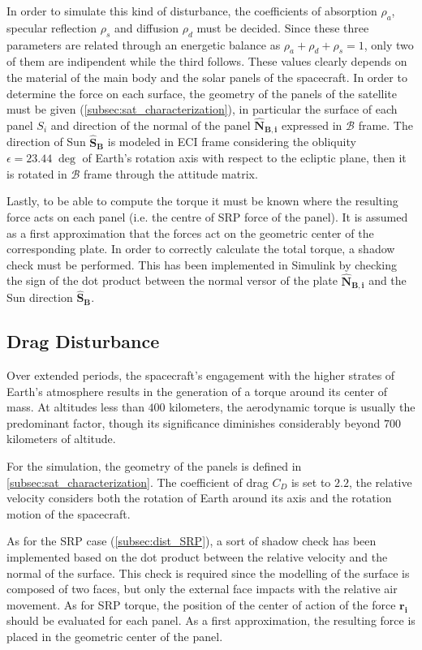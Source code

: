 In order to simulate this kind of disturbance, the coefficients of absorption $\rho_a$, specular reflection $\rho_s$ and diffusion $\rho_d$ must be decided. Since these three parameters are related through an energetic balance as $\rho_a + \rho_d + \rho_s = 1$, only two of them are indipendent while the third follows. These values clearly depends on the material of the main body and the solar panels of the spacecraft.
In order to determine the force on each surface, the geometry of the panels of the satellite must be given (\autoref{subsec:sat_characterization}), in particular the surface of each panel $S_i$ and direction of the normal of the panel $\boldsymbol{\hat{N}_{B,i}}$ expressed in $\mathcal{B}$ frame.
The direction of Sun $\boldsymbol{\hat{S}_B}$ is modeled in ECI frame considering the obliquity $\epsilon = 23.44 \; \deg$ of Earth's rotation axis with respect to the ecliptic plane, then it is rotated in $\mathcal{B}$ frame through the attitude matrix.

Lastly, to be able to compute the torque it must be known where the resulting force acts on each panel (i.e. the centre of SRP force of the panel). It is assumed as a first approximation that the forces act on the geometric center of the corresponding plate. In order to correctly calculate the total torque, a shadow check must be performed. This has been implemented in Simulink by checking the sign of the dot product between the normal versor of the plate $\boldsymbol{\hat{N}_{B,i}}$ and the Sun direction $\boldsymbol{\hat{S}_B}$.


\subsection{Drag Disturbance}
\label{subsec:dist_drag}

Over extended periods, the spacecraft's engagement with the higher strates of Earth's atmosphere results in the generation of a torque around its center of mass. At altitudes less than $400$ kilometers, the aerodynamic torque is usually the predominant factor, though its significance diminishes considerably beyond $700$ kilometers of altitude.

For the simulation, the geometry of the panels is defined in \autoref{subsec:sat_characterization}. The coefficient of drag $C_D$ is set to $2.2$, the relative velocity considers both the rotation of Earth around its axis and the rotation motion of the spacecraft.

As for the SRP case (\autoref{subsec:dist_SRP}), a sort of shadow check has been implemented based on the dot product between the relative velocity and the normal of the surface. This check is required since the modelling of the surface is composed of two faces, but only the external face impacts with the relative air movement.
As for SRP torque, the position of the center of action of the force $\boldsymbol{r_i}$ should be evaluated for each panel. As a first approximation, the resulting force is placed in the geometric center of the panel.

